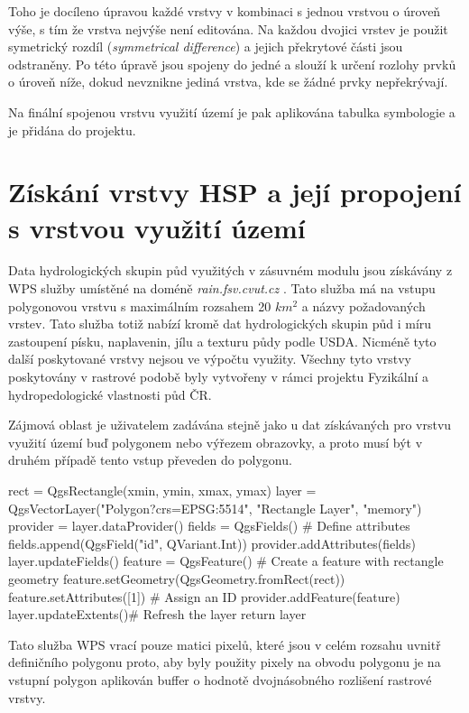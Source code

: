 \documentclass[a4paper,oneside,12pt]{book}
\begin{document}
  \hspace{10mm} Toho je docíleno úpravou každé vrstvy v kombinaci s jednou vrstvou o úroveň výše, s tím že vrstva nejvýše není editována. Na každou dvojici vrstev je použit symetrický rozdíl (\textit{symmetrical difference}) a jejich překrytové části jsou odstraněny. Po této úpravě jsou spojeny do jedné a slouží k určení rozlohy prvků o úroveň níže, dokud nevznikne jediná vrstva, kde se žádné prvky nepřekrývají.
  
 Na finální spojenou vrstvu využití území je pak aplikována tabulka symbologie a je přidána do projektu.
 
\section{Získání vrstvy HSP a její propojení s vrstvou využití území} \label{intersection}
 \hspace{10mm}Data hydrologických skupin půd využitých v zásuvném modulu jsou získávány z WPS služby umístěné na doméně \textit{rain.fsv.cvut.cz} . Tato služba má na vstupu polygonovou vrstvu s maximálním rozsahem 20 $km^2$ a názvy požadovaných vrstev. Tato služba totiž nabízí kromě dat hydrologických skupin půd i míru zastoupení písku, naplavenin, jílu a texturu půdy podle USDA. Nicméně tyto další poskytované vrstvy nejsou ve výpočtu využity. Všechny tyto vrstvy poskytovány v rastrové podobě byly vytvořeny v rámci projektu Fyzikální a hydropedologické vlastnosti půd ČR.

 \hspace{10mm}Zájmová oblast je uživatelem zadávána stejně jako u dat získávaných pro vrstvu využití území buď polygonem nebo výřezem obrazovky, a proto musí být v druhém případě tento vstup převeden do polygonu.  
\begin{pythoncode}[style=mypython, caption={Převod výřezu obrazovky na polygon},label={kod:extenttoplg}]
rect = QgsRectangle(xmin, ymin, xmax, ymax)
layer = QgsVectorLayer("Polygon?crs=EPSG:5514", "Rectangle Layer", "memory")
provider = layer.dataProvider()
fields = QgsFields() # Define attributes
fields.append(QgsField("id", QVariant.Int))
provider.addAttributes(fields)
layer.updateFields()
feature = QgsFeature() # Create a feature with rectangle geometry
feature.setGeometry(QgsGeometry.fromRect(rect))
feature.setAttributes([1])  # Assign an ID
provider.addFeature(feature)
layer.updateExtents()# Refresh the layer
return layer
\end{pythoncode}

 \hspace{10mm}Tato služba WPS vrací pouze matici pixelů, které jsou v celém rozsahu uvnitř definičního polygonu proto, aby byly použity pixely na obvodu polygonu je na vstupní polygon aplikován buffer o hodnotě dvojnásobného rozlišení rastrové vrstvy. 
\end{document}
